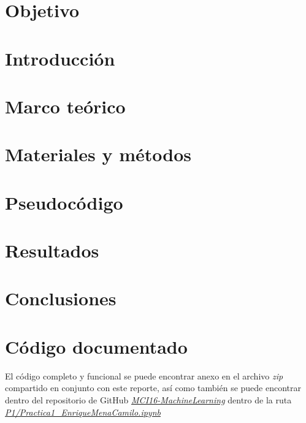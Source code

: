 \documentclass[12pt, letterpaper, spanish, twoside]{article}
\begin{document}
\lstset{inputencoding=utf8/latin1}
\renewcommand{\tablename}{Tabla}




\tableofcontents
\newpage


\section{Objetivo}


\section{Introducción}


\section{Marco teórico}


\section{Materiales y métodos}


\section{Pseudocódigo}


\section{Resultados}


\section{Conclusiones}


\nocite{*}
\renewcommand{\refname}{Referencias bibliográficas}



\appendix
\section{Código documentado}
El código completo y funcional se puede encontrar anexo en el archivo \emph{zip} compartido en conjunto con este reporte, así como también se puede encontrar dentro del repositorio de GitHub \href{https://github.com/EnriqueMC557/434-MCI16-MachineLearning}{\emph{MCI16-MachineLearning}} dentro de la ruta \href{https://github.com/EnriqueMC557/434-MCI16-MachineLearning/blob/cc8776cda8a53e40dc4019aab9d41e4f5487b3bc/P1/Practica1_EnriqueMenaCamilo.ipynb}{\emph{P1/Practica1\_EnriqueMenaCamilo.ipynb}}
\end{document}
